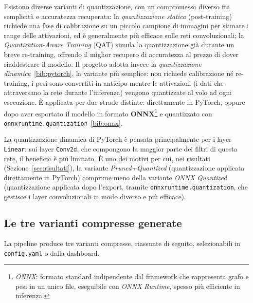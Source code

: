 Esistono diverse varianti di quantizzazione, con un compromesso diverso fra
semplicità e accuratezza recuperata: la \emph{quantizzazione statica}
(post-training) richiede una fase di calibrazione su un piccolo campione di
immagini per stimare i range delle attivazioni, ed è generalmente più
efficace sulle reti convoluzionali; la \emph{Quantization-Aware Training}
(QAT) simula la quantizzazione già durante un breve re-training, offrendo il
miglior recupero di accuratezza al prezzo di dover riaddestrare il modello.
Il progetto adotta invece la \emph{quantizzazione dinamica}~\ref{bib:pytorch},
la variante più semplice: non richiede calibrazione né re-training, i pesi
sono convertiti in anticipo mentre le attivazioni (i dati che attraversano
la rete durante l'inferenza) vengono quantizzate al volo ad ogni esecuzione.
È applicata per due strade distinte: direttamente in PyTorch, oppure dopo
aver esportato il modello in formato \textbf{ONNX}\footnote{\emph{ONNX}:
formato standard indipendente dal framework che rappresenta grafo e pesi in
un unico file, eseguibile con \emph{ONNX Runtime}, spesso più efficiente in
inferenza.} e quantizzato con \texttt{onnxruntime.quantization}~\ref{bib:onnx}.

\begin{notebox}
La quantizzazione dinamica di PyTorch è pensata principalmente per i layer
\texttt{Linear}: sui layer \texttt{Conv2d}, che compongono la maggior parte
dei filtri di questa rete, il beneficio è più limitato. È uno dei motivi per
cui, nei risultati (Sezione~\ref{sec:risultati}), la variante
\emph{Pruned+Quantized} (quantizzazione applicata direttamente in PyTorch)
comprime meno della variante \emph{ONNX Quantized} (quantizzazione applicata
dopo l'export, tramite \texttt{onnxruntime.quantization}, che gestisce i
layer convoluzionali in modo diverso e più efficace).
\end{notebox}

\subsection{Le tre varianti compresse generate}

La pipeline produce tre varianti compresse, riassunte di seguito, selezionabili in \texttt{config.yaml}
o dalla dashboard.

